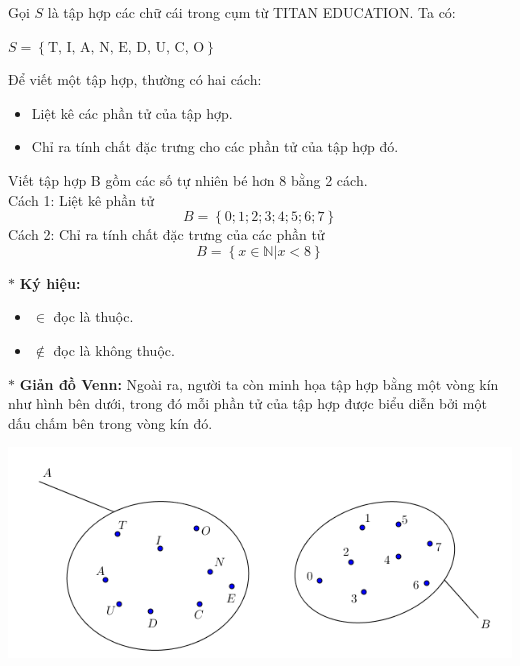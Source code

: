 \begin{tomtat}
\begin{vd}
\end{vd}
\begin{vd}
	Gọi $S$ là tập hợp các chữ cái trong cụm từ TITAN EDUCATION. Ta có:
\begin{center}
$S = \left\{ \text{T, I, A, N, E, D, U, C, O} \right\}$
\end{center}
\end{vd}
Để viết một tập hợp, thường có hai cách:
\begin{itemize}
\item Liệt kê các phần tử của tập hợp.
\item Chỉ ra tính chất đặc trưng cho các phần tử của tập hợp đó.
\end{itemize}
\begin{vd}
	Viết tập hợp B gồm các số tự nhiên bé hơn 8 bằng 2 cách.\\
Cách 1: Liệt kê phần tử
\[B = \left\{ 0; 1; 2; 3; 4; 5; 6; 7\right\}\]
Cách 2: Chỉ ra tính chất đặc trưng của các phần tử
\[B = \left\{ {x \in \mathbb{N}|x < 8} \right\}\]
\end{vd}
$*$ \textbf{Ký hiệu:}
\begin{itemize}
\item $\in$ đọc là thuộc.
\item $\notin$ đọc là không thuộc.
\end{itemize}
$*$ \textbf{Giản đồ Venn:} Ngoài ra, người ta còn minh họa tập hợp bằng một vòng kín như hình bên dưới, trong đó mỗi phần tử của tập hợp được biểu diễn bởi một dấu chấm bên trong vòng kín đó.
\begin{center}
\includegraphics[scale=0.65]{img/Venn}
\end{center}
\end{tomtat}

